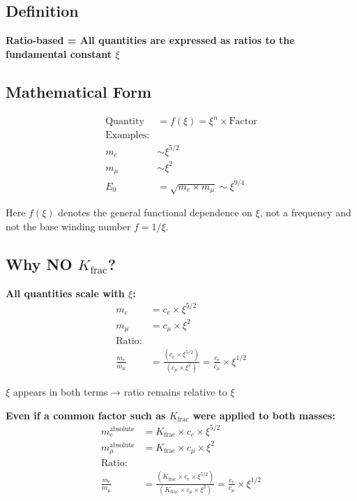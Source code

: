 	\subsection{Definition}
	
	\textbf{Ratio-based = All quantities are expressed as ratios to the fundamental constant $\xi$}
	
	\subsection{Mathematical Form}
	\begin{align*}
		\text{Quantity} &= f(\xi) = \xi^n \times \text{Factor} \\
		\text{Examples:} & \\
		m_e &\sim \xi^{5/2} \\
		m_μ &\sim \xi^2 \\
		E_0 &= \sqrt{m_e \times m_μ} \sim \xi^{9/4}
	\end{align*}

Here $f(\xi)$ denotes the general functional dependence on $\xi$, not a frequency and not the base winding number $f = 1/\xi$.

	\subsection{Why NO $K_{\text{frac}}$?}
	
	\textbf{All quantities scale with $\xi$:}
	\begin{align*}
		m_e &= c_e \times \xi^{5/2} \\
		m_μ &= c_μ \times \xi^2 \\
		\text{Ratio:} & \\
		\frac{m_e}{m_μ} &= \frac{(c_e \times \xi^{5/2})}{(c_μ \times \xi^2)} = \frac{c_e}{c_μ} \times \xi^{1/2}
	\end{align*}
	
	$\xi$ appears in both terms → ratio remains relative to $\xi$
	
	\textbf{Even if a common factor such as $K_{\text{frac}}$ were applied to both masses:}
	\begin{align*}
		m_e^{\text{absolute}} &= K_{\text{frac}} \times c_e \times \xi^{5/2} \\
		m_μ^{\text{absolute}} &= K_{\text{frac}} \times c_μ \times \xi^2 \\
		\text{Ratio:} & \\
		\frac{m_e}{m_μ} &= \frac{(K_{\text{frac}} \times c_e \times \xi^{5/2})}{(K_{\text{frac}} \times c_μ \times \xi^2)} = \frac{c_e}{c_μ} \times \xi^{1/2}
	\end{align*}
	
